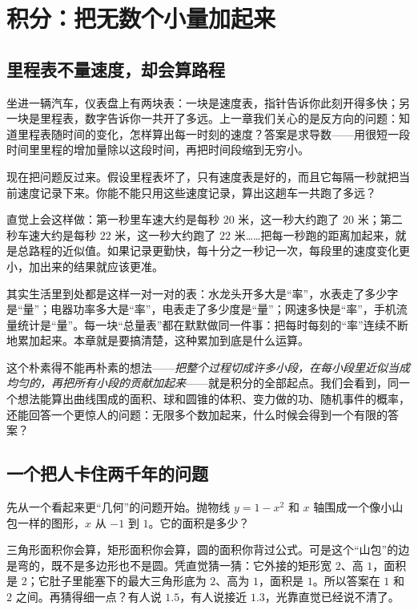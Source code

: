 \chapter{积分：把无数个小量加起来}

\section{里程表不量速度，却会算路程}

坐进一辆汽车，仪表盘上有两块表：一块是速度表，指针告诉你此刻开得多快；另一块是里程表，数字告诉你一共开了多远。上一章我们关心的是反方向的问题：知道里程表随时间的变化，怎样算出每一时刻的速度？答案是求导数——用很短一段时间里里程的增加量除以这段时间，再把时间段缩到无穷小。

现在把问题反过来。假设里程表坏了，只有速度表是好的，而且它每隔一秒就把当前速度记录下来。你能不能只用这些速度记录，算出这趟车一共跑了多远？

直觉上会这样做：第一秒里车速大约是每秒 $20$ 米，这一秒大约跑了 $20$ 米；第二秒车速大约是每秒 $22$ 米，这一秒大约跑了 $22$ 米……把每一秒跑的距离加起来，就是总路程的近似值。如果记录更勤快，每十分之一秒记一次，每段里的速度变化更小，加出来的结果就应该更准。

其实生活里到处都是这样一对一对的表：水龙头开多大是“率”，水表走了多少字是“量”；电器功率多大是“率”，电表走了多少度是“量”；网速多快是“率”，手机流量统计是“量”。每一块“总量表”都在默默做同一件事：把每时每刻的“率”连续不断地累加起来。本章就是要搞清楚，这种累加到底是什么运算。

这个朴素得不能再朴素的想法——\emph{把整个过程切成许多小段，在每小段里近似当成均匀的，再把所有小段的贡献加起来}——就是积分的全部起点。我们会看到，同一个想法能算出曲线围成的面积、球和圆锥的体积、变力做的功、随机事件的概率，还能回答一个更惊人的问题：无限多个数加起来，什么时候会得到一个有限的答案？

\section{一个把人卡住两千年的问题}

先从一个看起来更“几何”的问题开始。抛物线 $y=1-x^{2}$ 和 $x$ 轴围成一个像小山包一样的图形，$x$ 从 $-1$ 到 $1$。它的面积是多少？

三角形面积你会算，矩形面积你会算，圆的面积你背过公式。可是这个“山包”的边是弯的，既不是多边形也不是圆。凭直觉猜一猜：它外接的矩形宽 $2$、高 $1$，面积是 $2$；它肚子里能塞下的最大三角形底为 $2$、高为 $1$，面积是 $1$。所以答案在 $1$ 和 $2$ 之间。再猜得细一点？有人说 $1.5$，有人说接近 $1.3$，光靠直觉已经说不清了。

